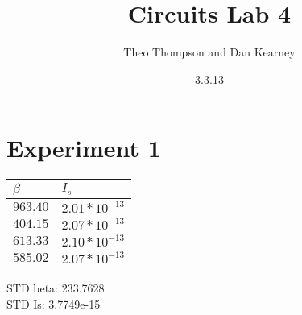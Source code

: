 \documentclass{article}
\title{Circuits Lab 4}
\author{Theo Thompson and Dan Kearney}
\date{3.3.13}
\begin{document}
\maketitle

\section*{Experiment 1}

\begin{center}
    \begin{tabular}{| l | l |} \hline
    $\beta$ & $I_{s}$ \\ \hline \hline
    $963.40$ & $2.01*10^{-13}$ \\ \hline
    $404.15$ & $2.07*10^{-13}$\\ \hline
    $613.33$ & $2.10*10^{-13}$ \\ \hline
    $585.02$ & $2.07*10^{-13}$ \\ \hline
    \end{tabular}
    STD beta: 233.7628\\
    STD Is: 3.7749e-15
\end{center}
\end{document}
